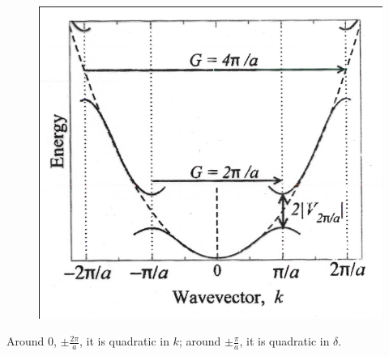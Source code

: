 \documentclass[a4paper, 11pt, normalem]{report}
\begin{document}
\begin{figure}[H]
    \centering
    \includegraphics[scale=0.5]{disp.png}
\end{figure}
Around 0, $\pm\frac{2\pi}{a}$, it is quadratic in $k$; around $\pm\frac{\pi}{a}$, it is quadratic in $\delta$.
\end{document}
